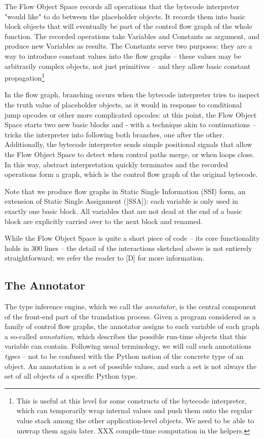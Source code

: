 \documentclass{acm_proc_article-sp}
\begin{document}
The Flow Object Space records all operations that the bytecode
interpreter "would like" to do between the placeholder objects.  It
records them into basic block objects that will eventually be part of
the control flow graph of the whole function.  The recorded operations
take Variables and Constants as argument, and produce new Variables as
results.  The Constants serve two purposes: they are a way to
introduce constant values into the flow graphs -- these values may be
arbitrarily complex objects, not just primitives -- and they allow
basic constant propagation\footnote{This is useful at this level for
some constructs of the bytecode interpreter, which can temporarily
wrap internal values and push them onto the regular value stack among
the other application-level objects.  We need to be able to unwrap
them again later. XXX compile-time computation in the helpers.}

In the flow graph, branching occurs when the bytecode interpreter tries
to inspect the truth value of placeholder objects, as it would in
response to conditional jump opcodes or other more complicated opcodes:
at this point, the Flow Object Space starts two new basic blocks and -
with a technique akin to continuations -- tricks the interpreter into
following both branches, one after the other.  Additionally, the
bytecode interpreter sends simple positional signals that allow the Flow
Object Space to detect when control paths merge, or when loops close.
In this way, abstract interpretation quickly terminates and the recorded
operations form a graph, which is the control flow graph of the original
bytecode.

Note that we produce flow graphs in Static Single Information (SSI)
form, an extension of Static Single Assignment ([SSA]): each variable is
only used in exactly one basic block.  All variables that are not dead
at the end of a basic block are explicitly carried over to the next
block and renamed.

While the Flow Object Space is quite a short piece of code -- its core
functionality holds in 300 lines -- the detail of the interactions
sketched above is not entierely straightforward; we refer the reader to
[D] for more information.


\subsection{The Annotator}

The type inference engine, which we call the \textit{annotator}, is the central
component of the front-end part of the translation process.  Given a
program considered as a family of control flow graphs, the annotator
assigns to each variable of each graph a so-called \textit{annotation}, which
describes the possible run-time objects that this variable can contain.
Following usual terminology, we will call such annotations \textit{types} -- not
to be confused with the Python notion of the concrete type of an object.
An annotation is a set of possible values, and such a set is not always
the set of all objects of a specific Python type.
\end{document}
